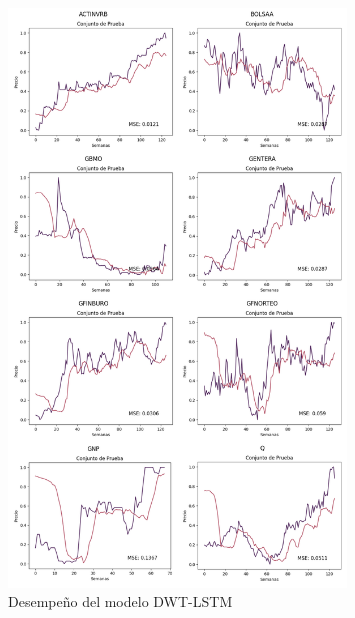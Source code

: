 \begin{figure}[H]
    \centering
    \includegraphics[width=0.8\textwidth]{Figuras/analisis/DWT_LSTM.png}
    \caption{Desempeño del modelo DWT-LSTM} 
    \label{fig:desempenio_DWTLSTM}
\end{figure}

